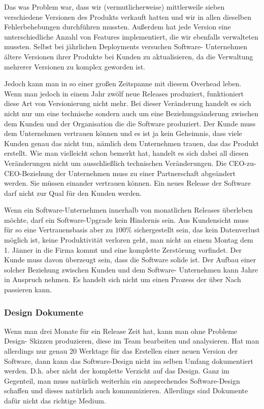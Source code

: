 Das was Problem war, dass wir (vermutlicherweise) mittlerweile sieben
verschiedene Versionen des Produkts verkauft hatten und wir in allen dieselben
Fehlerbehebungen durchführen mussten. Außerdem hat jede Version eine
unterschiedliche Anzahl von Features implementiert, die wir ebenfalls
verwalteten mussten. Selbst bei jährlichen Deployments versuchen Software-
Unternehmen ältere Versionen ihrer Produkte bei Kunden zu aktualisieren, da
die Verwaltung mehrerer Versionen zu komplex geworden ist.

Jedoch kann man in so einer großen Zeitspanne mit diesem Overhead leben. Wenn
man jedoch in einem Jahr zwölf neue Releases produziert, funktioniert diese
Art von Versionierung nicht mehr. Bei dieser Veränderung handelt es sich nicht
nur um eine technische sondern auch um eine Beziehungsänderung zwischen dem
Kunden und der Organisation die die Software produziert. Der Kunde muss dem
Unternehmen vertrauen können und es ist ja kein Geheimnis, dass viele Kunden
genau das nicht tun, nämlich dem Unternehmen trauen, das das Produkt erstellt.
Wie man vielleicht schon bemerkt hat, handelt es sich dabei all diesen
Veränderungen nicht um ausschließlich technischen Veränderungen. Die CEO-zu-
CEO-Beziehung der Unternehmen muss zu einer Partnerschaft abgeändert werden.
Sie müssen einander vertrauen können. Ein neues Release der Software darf
nicht zur Qual für den Kunden werden.

Wenn ein Software-Unternehmen innerhalb von monatlichen Releases überleben
möchte, darf ein Software-Upgrade kein Hindernis sein. Aus Kundensicht muss
für so eine Vertrauensbasis aber zu $100\%$ sichergestellt sein, das kein
Datenverlust möglich ist, keine Produktivität verloren geht, man nicht an
einem Montag dem 1. Jänner in die Firma kommt und eine komplette Zerstörung
vorfindet. Der Kunde muss davon überzeugt sein, dass die Software solide ist.
Der Aufbau einer solcher Beziehung zwischen Kunden und dem Software-
Unternehmen kann Jahre in Anspruch nehmen. Es handelt sich nicht um einen
Prozess der über Nach passieren kann.

\subsubsection{Design Dokumente}
Wenn man drei Monate für ein Release Zeit hat, kann man ohne Probleme Design-
Skizzen produzieren, diese im Team bearbeiten und analysieren. Hat man
allerdings nur genau 20 Werktage für das Erstellen einer neuen Version der
Software, dann kann das Software-Design nicht im selben Umfang dokumentiert
werden. D.h. aber nicht der komplette Verzicht auf das Design. Ganz im
Gegenteil, man muss natürlich weiterhin ein ansprechendes Software-Design
schaffen und dieses natürlich auch kommunizieren. Allerdings sind Dokumente
dafür nicht das richtige Medium.

